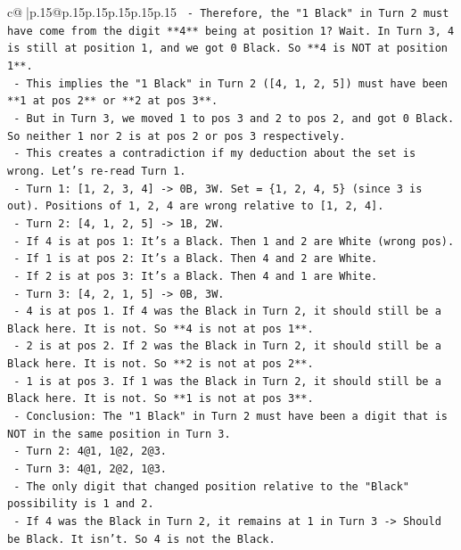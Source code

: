 \documentclass{article}
\begin{document}
{\begin{supertabular}{c@{$\;$}|p{.15\linewidth}@{}p{.15\linewidth}p{.15\linewidth}p{.15\linewidth}p{.15\linewidth}p{.15\linewidth}}
{{{\texttt{  {-} Therefore, the "1 Black" in Turn 2 must have come from the digit **4** being at position 1? Wait. In Turn 3, 4 is still at position 1, and we got 0 Black. So **4 is NOT at position 1**.} \\
\texttt{  {-} This implies the "1 Black" in Turn 2 ({[}4, 1, 2, 5{]}) must have been **1 at pos 2** or **2 at pos 3**.} \\
\texttt{  {-} But in Turn 3, we moved 1 to pos 3 and 2 to pos 2, and got 0 Black. So neither 1 nor 2 is at pos 2 or pos 3 respectively.} \\
\texttt{  {-} This creates a contradiction if my deduction about the set is wrong. Let's re{-}read Turn 1.} \\
\texttt{  {-} Turn 1: {[}1, 2, 3, 4{]} {-}> 0B, 3W. Set = \{1, 2, 4, 5\} (since 3 is out). Positions of 1, 2, 4 are wrong relative to {[}1, 2, 4{]}.} \\
\texttt{  {-} Turn 2: {[}4, 1, 2, 5{]} {-}> 1B, 2W.} \\
\texttt{    {-} If 4 is at pos 1: It's a Black. Then 1 and 2 are White (wrong pos).} \\
\texttt{    {-} If 1 is at pos 2: It's a Black. Then 4 and 2 are White.} \\
\texttt{    {-} If 2 is at pos 3: It's a Black. Then 4 and 1 are White.} \\
\texttt{  {-} Turn 3: {[}4, 2, 1, 5{]} {-}> 0B, 3W.} \\
\texttt{    {-} 4 is at pos 1. If 4 was the Black in Turn 2, it should still be a Black here. It is not. So **4 is not at pos 1**.} \\
\texttt{    {-} 2 is at pos 2. If 2 was the Black in Turn 2, it should still be a Black here. It is not. So **2 is not at pos 2**.} \\
\texttt{    {-} 1 is at pos 3. If 1 was the Black in Turn 2, it should still be a Black here. It is not. So **1 is not at pos 3**.} \\
\texttt{  {-} Conclusion: The "1 Black" in Turn 2 must have been a digit that is NOT in the same position in Turn 3.} \\
\texttt{    {-} Turn 2: 4@1, 1@2, 2@3.} \\
\texttt{    {-} Turn 3: 4@1, 2@2, 1@3.} \\
\texttt{    {-} The only digit that changed position relative to the "Black" possibility is 1 and 2.} \\
\texttt{    {-} If 4 was the Black in Turn 2, it remains at 1 in Turn 3 {-}> Should be Black. It isn't. So 4 is not the Black.} \\
}}}
\end{supertabular}}
\end{document}
